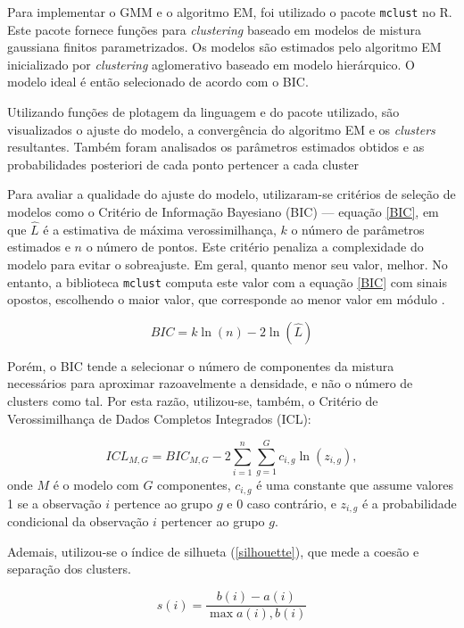 \documentclass[12pt]{article}
\begin{document}
Para implementar o GMM e o algoritmo EM, foi utilizado o pacote \texttt{mclust} no R. Este pacote fornece funções para \textit{clustering} baseado em modelos de mistura gaussiana finitos parametrizados. Os modelos são estimados pelo algoritmo EM inicializado por \textit{clustering} aglomerativo baseado em modelo hierárquico. O modelo ideal é então selecionado de acordo com o BIC.

Utilizando funções de plotagem da linguagem e do pacote utilizado, são visualizados o ajuste do modelo, a convergência do algoritmo EM e os \textit{clusters} resultantes. Também foram analisados os parâmetros estimados obtidos e as probabilidades posteriori de cada ponto pertencer a cada cluster

Para avaliar a qualidade do ajuste do modelo, utilizaram-se critérios de seleção de modelos como o Critério de Informação Bayesiano (BIC) — equação \ref{BIC}, em que $\hat{L}$ é a estimativa de máxima verossimilhança, $k$ o número de parâmetros estimados e $n$ o número de pontos. Este critério penaliza a complexidade do modelo para evitar o sobreajuste. Em geral, quanto menor seu valor, melhor. No entanto, a biblioteca \texttt{mclust} computa este valor com a equação \ref{BIC} com sinais opostos, escolhendo o maior valor, que corresponde ao menor valor em módulo \citep{scrucca2016mclust}.

\begin{equation} \label{BIC}
    BIC = k \ln(n) -2\ln(\hat{L})
\end{equation}

Porém, o BIC tende a selecionar o número de componentes da mistura necessários para aproximar razoavelmente a densidade, e não o número de clusters como tal. Por esta razão, utilizou-se, também, o Critério de Verossimilhança de Dados Completos Integrados (ICL):

\begin{equation}\label{ICL}
    ICL_{M,G} = BIC_{M,G} - 2 \sum_{i=1}^{n} \sum_{g=1}^{G} c_{i,g} \ln(z_{i,g}),
\end{equation}
onde $M$ é o modelo com $G$ componentes, $c_{i,g}$ é uma constante que assume valores 1 se a observação $i$ pertence ao grupo $g$ e 0 caso contrário, e $z_{i,g}$ é a probabilidade condicional da observação $i$ pertencer ao grupo $g$.

Ademais, utilizou-se o índice de silhueta (\ref{silhouette}), que mede a coesão e separação dos clusters.

\begin{equation}
    s(i) = \frac{b(i) - a(i)}{\max{a(i), b(i)}}\label{silhouette}
\end{equation}
\end{document}
